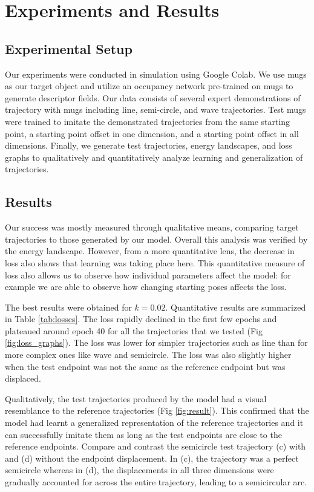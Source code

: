 \documentclass[10pt,twocolumn,letterpaper]{article}
\begin{document}
\section{Experiments and Results}

\subsection{Experimental Setup}
\label{setup}

Our experiments were conducted in simulation using Google Colab. We use mugs as our target object and utilize an occupancy network pre-trained on mugs to generate descriptor fields. Our data consists of several expert demonstrations of trajectory with mugs including line, semi-circle, and wave trajectories. Test mugs were trained to imitate the demonstrated trajectories from the same starting point, a starting point offset in one dimension, and a starting point offset in all dimensions. Finally, we generate test trajectories, energy landscapes, and loss graphs to qualitatively and quantitatively analyze learning and generalization of trajectories.

\subsection{Results}
\label{results}

Our success was mostly measured through qualitative means, comparing target trajectories to those generated by our model. Overall this analysis was verified by the energy landscape. However, from a more quantitative lens, the decrease in loss also shows that learning was taking place here. This quantitative measure of loss also allows us to observe how individual parameters affect the model: for example we are able to observe how changing starting poses affects the loss.

The best results were obtained for $k = 0.02$.
Quantitative results are summarized in Table \ref{tab:losses}. The loss rapidly declined in the first few epochs and plateaued around epoch 40 for all the trajectories that we tested (Fig \ref{fig:loss_graphs}). The loss was lower for simpler trajectories such as line than for more complex ones like wave and semicircle. The loss was also slightly higher when the test endpoint was not the same as the reference endpoint but was displaced.

Qualitatively, the test trajectories produced by the model had a visual resemblance to the reference trajectories (Fig \ref{fig:result}). This confirmed that the model had learnt a generalized representation of the reference trajectories and it can successfully imitate them as long as the test endpoints are close to the reference endpoints. Compare and contrast the semicircle test trajectory (c) with and (d) without the endpoint displacement. In (c), the trajectory was a perfect semicircle whereas in (d), the displacements in all three dimensions were gradually accounted for across the entire trajectory, leading to a semicircular arc.
\end{document}

